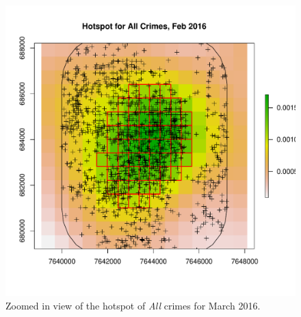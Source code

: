 \documentclass[12pt,letterpaper]{article}
\theoremstyle{plain}
\theoremstyle{plain}
\theoremstyle{definition}
\theoremstyle{remark}
\begin{document}
\begin{figure}[h!]
    \centering
    \includegraphics[scale=0.9]{figures/hotspot_all.pdf}
    \caption{Zoomed in view of the hotspot of \emph{All} crimes for March 2016.}
    \label{fig:figure1}
\end{figure}
\end{document}
